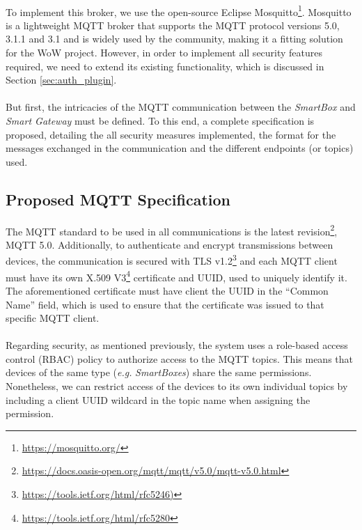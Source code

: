 \paragraph{} To implement this broker, we use the open-source Eclipse Mosquitto\footnote{\url{https://mosquitto.org/}}. Mosquitto is a lightweight \acs{MQTT} broker that supports the \acs{MQTT} protocol versions 5.0, 3.1.1 and 3.1 and is widely used by the community, making it a fitting solution for the \acs{WoW} project. However, in order to implement all security features required, we need to extend its existing functionality, which is discussed in Section \ref{sec:auth_plugin}.

\paragraph{} But first, the intricacies of the \acs{MQTT} communication between the \textit{SmartBox} and \textit{Smart Gateway} must be defined. To this end, a complete specification is proposed, detailing the all security measures implemented, the format for the messages exchanged in the communication and the different endpoints (or topics) used. 

\subsection{Proposed \acs{MQTT} Specification}

The \acs{MQTT} standard to be used in all communications is the latest revision\footnote{\url{https://docs.oasis-open.org/mqtt/mqtt/v5.0/mqtt-v5.0.html}}, MQTT 5.0. Additionally, to authenticate and encrypt transmissions between devices, the communication is secured with \acs{TLS} v1.2\footnote{\url{https://tools.ietf.org/html/rfc5246)}} and each \acs{MQTT} client must have its own X.509 V3\footnote{\url{https://tools.ietf.org/html/rfc5280}} certificate and \acs{UUID}, used to uniquely identify it. The aforementioned certificate must have client the \acs{UUID} in the ``Common Name'' field, which is used to ensure that the certificate was issued to that specific \acs{MQTT} client.

\paragraph{} Regarding security, as mentioned previously, the system uses a role-based access control (\acs{RBAC}) policy to authorize access to the \acs{MQTT} topics. This means that devices of the same type (\textit{e.g.} \textit{SmartBoxes}) share the same permissions. 
Nonetheless, we can restrict access of the devices to its own individual topics by including a client \acs{UUID} wildcard in the topic name when assigning the permission.


